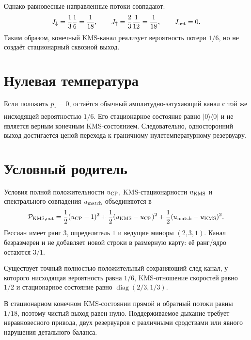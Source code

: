 Однако равновесные направленные потоки совпадают:
\begin{equation}
 J_\downarrow=\frac13\frac16=\frac1{18},
 \qquad
 J_\uparrow=\frac23\frac1{12}=\frac1{18},
 \qquad
 J_{\rm net}=0.
 \label{eq:v10-k43-kms-zero-current}
\end{equation}
Таким образом, конечный KMS-канал реализует вероятность потери $1/6$, но
не создаёт стационарный сквозной выход.

\section{Нулевая температура}

Если положить $p_\uparrow=0$, остаётся обычный амплитудно-затухающий канал
с той же нисходящей вероятностью $1/6$. Его стационарное состояние равно
$|0\rangle\langle0|$ и не является верным конечным KMS-состоянием.
Следовательно, односторонний выход достигается ценой перехода к граничному
нулетемпературному резервуару.

\section{Условный родитель}

Условия полной положительности $u_{\rm CP}$, KMS-стационарности
$u_{\rm KMS}$ и спектрального совпадения $u_{\rm match}$ объединяются в
\begin{equation}
 \mathcal P_{\rm KMS,out}
 =\frac12(u_{\rm CP}-1)^2
 +\frac12(u_{\rm KMS}-u_{\rm CP})^2
 +\frac12(u_{\rm match}-u_{\rm KMS})^2.
 \label{eq:v10-k43-kms-parent}
\end{equation}
Гессиан имеет ранг $3$, определитель $1$ и ведущие миноры $(2,3,1)$.
Канал безразмерен и не добавляет новой строки в размерную карту: её
ранг/ядро остаются $3/1$.

\begin{theorem}
Существует точный полностью положительный сохраняющий след канал, у которого
нисходящая вероятность равна $1/6$, KMS-отношение скоростей равно $1/2$ и
стационарное состояние равно $\operatorname{diag}(2/3,1/3)$.
\end{theorem}

\begin{nogocriterion}
В стационарном конечном KMS-состоянии прямой и обратный потоки равны
$1/18$, поэтому чистый выход равен нулю. Поддерживаемое дыхание требует
неравновесного привода, двух резервуаров с различными сродствами или явного
нарушения детального баланса.
\end{nogocriterion}

